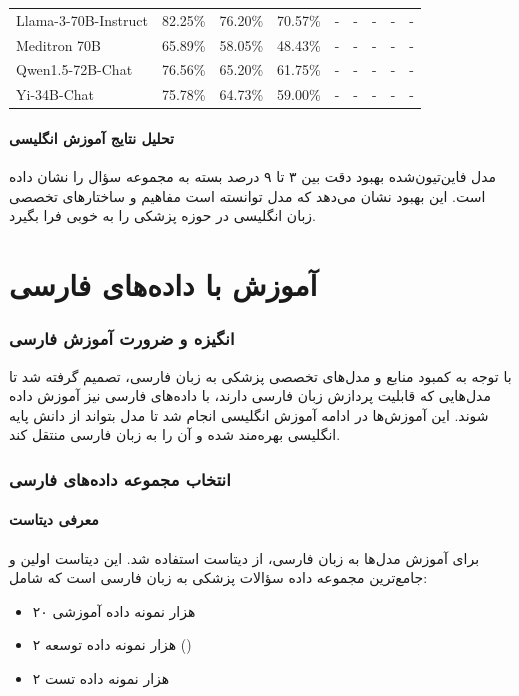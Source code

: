 \documentclass[11pt, a4paper, oneside]{book}
\begin{document}
\begin{table}[h!]
\begin{latin}
{\begin{tabular}{lcccccccc}
					\hline
					Llama-3-70B-Instruct & 82.25\% & 76.20\% & 70.57\% & - & - & - & - & - \\
					Meditron 70B & 65.89\% & 58.05\% & 48.43\% & - & - & - & - & - \\
					Qwen1.5-72B-Chat & 76.56\% & 65.20\% & 61.75\% & - & - & - & - & - \\
					Yi-34B-Chat & 75.78\% & 64.73\% & 59.00\% & - & - & - & - & - \\
					\hline
				\end{tabular}
			}
		\end{latin}
	\end{table}

	\subsection{تحلیل نتایج آموزش انگلیسی}
	مدل فاین‌تیون‌شده بهبود دقت بین ۳ تا ۹ درصد بسته به مجموعه سؤال را نشان داده است. این بهبود نشان می‌دهد که مدل توانسته است مفاهیم و ساختارهای تخصصی زبان انگلیسی در حوزه پزشکی را به خوبی فرا بگیرد.

	\part{آموزش با داده‌های فارسی}

	\section{انگیزه و ضرورت آموزش فارسی}
	با توجه به کمبود منابع و مدل‌های تخصصی پزشکی به زبان فارسی، تصمیم گرفته شد تا مدل‌هایی که قابلیت پردازش زبان فارسی دارند، با داده‌های فارسی نیز آموزش داده شوند. این آموزش‌ها در ادامه آموزش انگلیسی انجام شد تا مدل بتواند از دانش پایه انگلیسی بهره‌مند شده و آن را به زبان فارسی منتقل کند.

	\section{انتخاب مجموعه داده‌های فارسی}
	\subsection{معرفی دیتاست }
	برای آموزش مدل‌ها به زبان فارسی، از دیتاست  استفاده شد. این دیتاست اولین و جامع‌ترین مجموعه داده سؤالات پزشکی به زبان فارسی است که شامل:
	\begin{itemize}
		\item ۲۰ هزار نمونه داده آموزشی
		\item ۲ هزار نمونه داده توسعه ()
		\item ۲ هزار نمونه داده تست
	\end{itemize}
\end{document}
